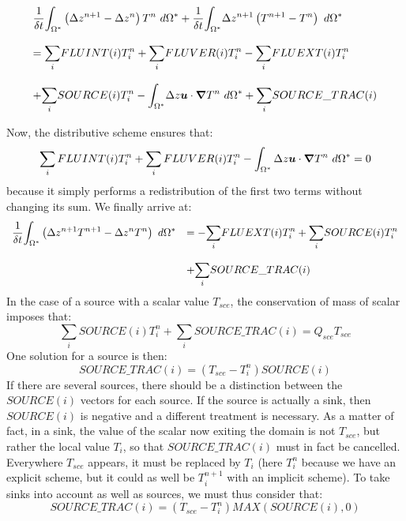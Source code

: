 \begin{equation}
\begin{array}{l}
\dfrac{1}{\delta t}\displaystyle{\int_{\Omega^{\ast}}}
\left(\Delta z^{n+1}-\Delta z^{n}\right)T^{n}~d\Omega^{\ast}
+\dfrac{1}{\delta t}\displaystyle{\int_{\Omega^{\ast}}}\Delta z^{n+1}
\left(T^{n+1}-T^{n}\right)  ~d\Omega^{\ast}\bigskip\\
=\displaystyle{\sum_{i}}FLUINT(i)T_{i}^{n}+
\displaystyle{\sum_{i}}FLUVER(i)T_{i}^{n}
-\displaystyle{\sum_{i}}FLUEXT(i)T_{i}^{n}\bigskip\\
+\displaystyle{\sum_{i}}SOURCE(i)T_{i}^{n}
-\displaystyle{\int_{\Omega^{\ast}}}
\Delta z\vec{u}\cdot\Grad T^{n}~d\Omega^{\ast}
+\displaystyle{\sum_{i}}SOURCE\_TRAC(i)
\end{array}
\end{equation}

Now, the distributive scheme ensures that:%
\begin{equation}
\sum\limits_{i}FLUINT(i)T_{i}^{n}+\sum\limits_{i}FLUVER(i)T_{i}^{n}%
-\int_{\Omega^{\ast}}\Delta z\vec{u}\cdot\Grad T^{n}~d\Omega^{\ast}=0
\end{equation}
because it simply performs a redistribution of the first
two terms without changing its sum. We finally arrive at:
\begin{equation}
\begin{array}{ll}
\dfrac{1}{\delta t}\displaystyle{\int_{\Omega^{\ast}}}
\left(\Delta z^{n+1}T^{n+1}-\Delta z^{n}T^{n}\right)~d\Omega^{\ast} & =
-\displaystyle{\sum_{i}}FLUEXT(i)T_{i}^{n}
+\displaystyle{\sum_{i}}SOURCE(i)T_{i}^{n}\bigskip\\
& +\displaystyle{\sum_{i}}SOURCE\_TRAC(i)
\end{array}
\end{equation}
In the case of a source with a scalar value $T_{sce}$,
the conservation of mass of scalar imposes that:
\begin{equation}
\sum_{i}SOURCE(i)T_{i}^{n}+\sum_{i}SOURCE\_TRAC(i)=Q_{sce}T_{sce}
\end{equation}
One solution for a source is then:
\begin{equation}
SOURCE\_TRAC(i)=(T_{sce}-T_{i}^{n})SOURCE(i)
\end{equation}
If there are several sources, there should be a distinction between the
$SOURCE(i)$ vectors for each source.
If the source is actually a sink, then $SOURCE(i)$
is negative and a different treatment is necessary.
As a matter of fact, in a sink, the value of the
scalar now exiting the domain is not $T_{sce}$,
but rather the local value $T_{i}$, so that $SOURCE\_TRAC(i)$
must in fact be cancelled. Everywhere $T_{sce}$ appears, it must
be replaced by $T_{i}$ (here $T_{i}^{n} $ because we have an explicit
scheme, but it could as well be $T_{i}^{n+1}$ with an implicit scheme).
To take sinks into account as well as sources, we must thus
consider that:
\begin{equation}
SOURCE\_TRAC(i)=(T_{sce}-T_{i}^{n})MAX(SOURCE(i),0)
\end{equation}


